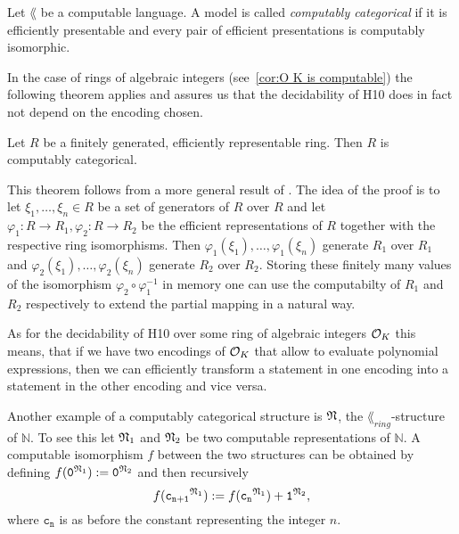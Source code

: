 \begin{defin}
  Let \(\lang\) be a computable language. A model is called \emph{computably
  categorical} if it is efficiently presentable and every pair of efficient
  presentations is computably isomorphic.
\end{defin}

In the case of rings of algebraic integers (see~\cref{cor:O K is computable})
the following theorem applies and assures us that the decidability of
\textsc{H10} does in fact not depend on the encoding chosen.

\begin{thm}\label{thm:computable categoricity}
  Let \(R\) be a finitely generated, efficiently representable ring. Then \(R\)
  is computably categorical.
\end{thm}

This theorem follows from a more general result of \textcite{Malcev1961}. The
idea of the proof is to let \(ξ_1, …, ξ_n ∈ R\) be a set of generators of \(R\)
over \(R\) and let \(φ_1: R → R_1, φ_2: R → R_2\) be the efficient
representations of \(R\) together with the respective ring isomorphisms. Then
\(φ_1(ξ_1), …, φ_1(ξ_n)\) generate \(R_1\) over \(R_1\) and \(φ_2(ξ_1), …,
φ_2(ξ_n)\) generate \(R_2\) over \(R_2\). Storing these finitely many values of
the isomorphism \(φ_2 \circ φ_1^{-1}\) in memory one can use the computabilty of
\(R_1\) and \(R_2\) respectively to extend the partial mapping in a natural
way.

As for the decidability of \textsc{H10} over some ring of algebraic integers
\(\mathcal{O}_{K}\) this means, that if we have two encodings of \(\mathcal{O}_{K}\) that allow
to evaluate polynomial expressions, then we can efficiently transform a
statement in one encoding into a statement in the other encoding and vice versa.

\begin{exam}\label{ex:N is computably categorical}
  Another example of a computably categorical structure is \(\mathfrak{N}\), the
  \(\lang_{ring}\)-structure of \(ℕ\). To see this let \(\mathfrak{N}_1\) and
  \(\mathfrak{N}_2\) be two computable representations of \(ℕ\). A computable
  isomorphism \(f\) between the two structures can be obtained by defining
  \(f(\mathtt{0}^{\mathfrak{N}_1}) := \mathtt{0}^{\mathfrak{N}_2}\) and then
  recursively
  \[
    f(\mathtt{c_{n + 1}}^{\mathfrak{N}_1}) := f(\mathtt{c_n}^{\mathfrak{N}_1}) +
    \mathtt{1}^{\mathfrak{N}_2},
  \]
  where \(\mathtt{c_{n}}\) is as before the constant representing the integer
  \(n\).
\end{exam}

